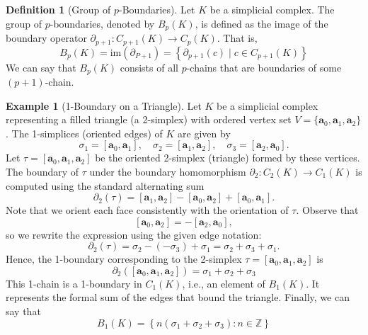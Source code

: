 \documentclass[12pt,oneside,reqno]{amsart}
\theoremstyle{plain}
\theoremstyle{definition}
\newtheorem{example}{Example}[section]
\newtheorem{definition}[theorem]{Definition}
\theoremstyle{remark}
\newcommand{\mrm}[1]{\mathrm{#1}}
\newcommand{\0}{{\textbf{0}}}
\begin{document}
\begin{definition}[Group of $p$-Boundaries]\label{d:Group of p Boundaries}
Let $K$ be a simplicial complex. The group of $p$-boundaries, denoted by $B_p(K)$, is defined as the image of the boundary operator $\partial_{p+1} \colon C_{p+1}(K) \to C_p(K)$. That is, 
\[B_p(K) = \mrm{im}(\partial_{P + 1}) = \left\{ \partial_{p+1}(c) \mid c \in C_{p+1}(K) \right\}
\]
We can say that $B_p(K)$ consists of all $p$-chains that are boundaries of some $(p+1)$-chain.
\end{definition}

\begin{example}[1-Boundary on a Triangle]
Let $K$ be a simplicial complex representing a filled triangle (a 2-simplex) with ordered vertex set $V = \{ \bm{a}_0, \bm{a}_1, \bm{a}_2 \}$. The 1-simplices (oriented edges) of $K$ are given by
\[
\sigma_1 = [\bm{a}_0, \bm{a}_1], \quad
\sigma_2 = [\bm{a}_1, \bm{a}_2], \quad
\sigma_3 = [\bm{a}_2, \bm{a}_0].
\]
Let $\tau = [\bm{a}_0, \bm{a}_1, \bm{a}_2]$ be the oriented 2-simplex (triangle) formed by these vertices. The boundary of $\tau$ under the boundary homomorphism $\partial_2 \colon C_2(K) \to C_1(K)$ is computed using the standard alternating sum
\[
\partial_2(\tau) = [\bm{a}_1, \bm{a}_2] - [\bm{a}_0, \bm{a}_2] + [\bm{a}_0, \bm{a}_1].
\]
Note that we orient each face consistently with the orientation of $\tau$. Observe that
\[
[\bm{a}_0, \bm{a}_2] = -[\bm{a}_2, \bm{a}_0],
\]
so we rewrite the expression using the given edge notation:
\[
\partial_2(\tau) = \sigma_2 - (-\sigma_3) + \sigma_1 = \sigma_2 + \sigma_3 + \sigma_1.
\]
Hence, the 1-boundary corresponding to the 2-simplex $\tau = [\bm{a}_0, \bm{a}_1, \bm{a}_2]$ is 
\[\partial_2([\bm{a}_0, \bm{a}_1, \bm{a}_2]) = \sigma_1 + \sigma_2 + \sigma_3\]
This 1-chain is a 1-boundary in $C_1(K)$, i.e., an element of $B_1(K)$. It represents the formal sum of the edges that bound the triangle. Finally, we can say that 
\[
B_1(K) = \left\{ n(\sigma_1 + \sigma_2 + \sigma_3) \colon  n \in \mathbb{Z} \right\}
\]
\end{example}
\end{document}
